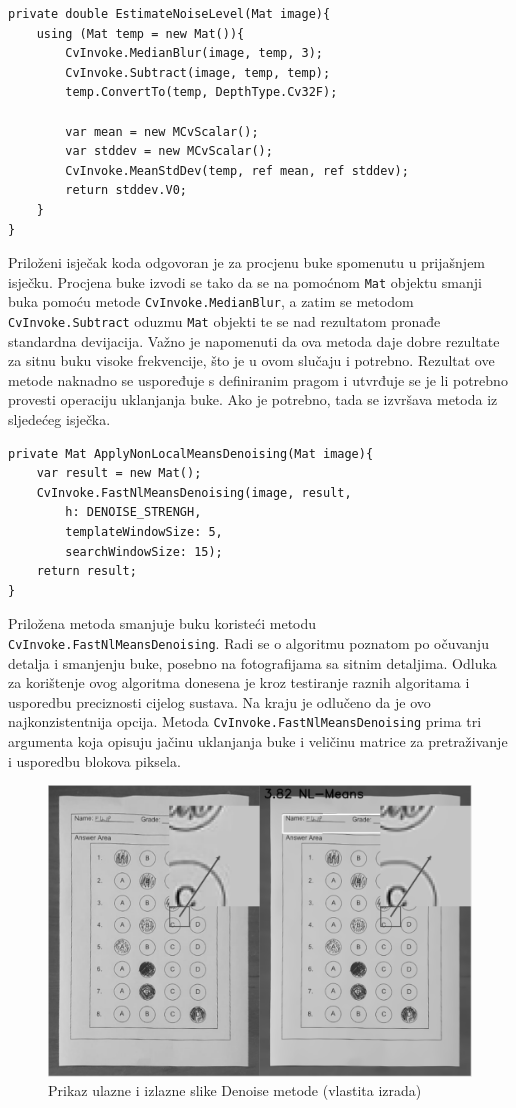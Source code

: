 \documentclass{foi}
\begin{document}
\begin{lstlisting}[caption={Procjena razine buke na slici}]
private double EstimateNoiseLevel(Mat image){
    using (Mat temp = new Mat()){
        CvInvoke.MedianBlur(image, temp, 3);
        CvInvoke.Subtract(image, temp, temp);
        temp.ConvertTo(temp, DepthType.Cv32F);

        var mean = new MCvScalar();
        var stddev = new MCvScalar();
        CvInvoke.MeanStdDev(temp, ref mean, ref stddev);
        return stddev.V0;
    }
}
\end{lstlisting}

Priloženi isječak koda odgovoran je za procjenu buke spomenutu u prijašnjem isječku. Procjena buke izvodi se tako da se na pomoćnom \texttt{Mat} objektu smanji buka pomoću metode \texttt{CvInvoke.MedianBlur}, a zatim se metodom \texttt{CvInvoke.Subtract} oduzmu \texttt{Mat} objekti te se nad rezultatom pronađe standardna devijacija. Važno je napomenuti da ova metoda daje dobre rezultate za sitnu buku visoke frekvencije, što je u ovom slučaju i potrebno. Rezultat ove metode naknadno se uspoređuje s definiranim pragom i utvrđuje se je li potrebno provesti operaciju uklanjanja buke. Ako je potrebno, tada se izvršava metoda iz sljedećeg isječka.

\begin{lstlisting}[caption={Metoda za smanjenje buke}]
private Mat ApplyNonLocalMeansDenoising(Mat image){
    var result = new Mat();
    CvInvoke.FastNlMeansDenoising(image, result,
        h: DENOISE_STRENGH,
        templateWindowSize: 5,
        searchWindowSize: 15);
    return result;
}
\end{lstlisting}

Priložena metoda smanjuje buku koristeći metodu \texttt{CvInvoke.FastNlMeansDenoising}. Radi se o algoritmu poznatom po očuvanju detalja i smanjenju buke, posebno na fotografijama sa sitnim detaljima. Odluka za korištenje ovog algoritma donesena je kroz testiranje raznih algoritama i usporedbu preciznosti cijelog sustava. Na kraju je odlučeno da je ovo najkonzistentnija opcija. Metoda \texttt{CvInvoke.FastNlMeansDenoising} prima tri argumenta koja opisuju jačinu uklanjanja buke i veličinu matrice za pretraživanje i usporedbu blokova piksela.


\begin{figure}[H]
\centering
\includegraphics[width=0.8\linewidth]{slike/DenoiseComparison.png}
\caption{Prikaz ulazne i izlazne slike Denoise metode (vlastita izrada)}
\end{figure}
\end{document}
